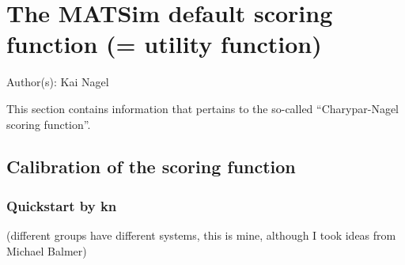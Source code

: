 \chapter{The MATSim default scoring function (= utility function)}

\centerline{\hfill Author(s): Kai Nagel}

\bigskip




This section contains information that pertains to the so-called ``Charypar-Nagel scoring function''.

\section{Calibration of the scoring function}

\subsection{Quickstart by kn}

(different groups have different systems, this is mine, although I took ideas from Michael Balmer)


